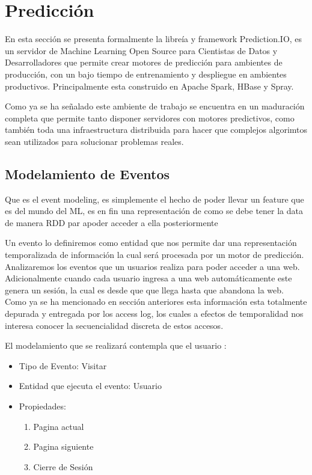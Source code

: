 

\section{Predicción }

  En esta sección se presenta formalmente la libreía y framework Prediction.IO, %
  es un servidor de Machine Learning Open Source para Cientistas de Datos y Desarrolladores que permite
  crear motores de predicción para ambientes de producción, con un bajo tiempo de entrenamiento y despliegue en ambientes productivos. Principalmente esta construido en Apache Spark, HBase y Spray.

  Como ya se ha señalado este ambiente de trabajo se encuentra en un maduración completa que permite tanto disponer
  servidores con motores predictivos, como también toda una infraestructura distribuida para hacer que complejos algorimtos
  sean utilizados para solucionar problemas reales.

  \subsection{Modelamiento de Eventos}

Que es el event modeling, es simplemente el hecho de poder llevar un feature  que es del mundo del ML, es en fin una representación de como se debe tener la data de manera RDD par apoder acceder a ella posteriormente 

  Un evento lo definiremos como entidad que nos permite dar una representación temporalizada de información la cual será procesada por un motor de predicción. Analizaremos los eventos que un usuarios realiza para poder acceder a una web. Adicionalmente cuando cada usuario ingresa a una web automáticamente este genera un sesión, la cual es desde que que llega hasta que abandona la web.
  Como ya se ha mencionado en sección anteriores esta información esta totalmente depurada y entregada por los access log, los cuales a efectos de temporalidad nos interesa conocer la secuencialidad discreta de estos accesos.






  El modelamiento que se realizará contempla que el usuario :


    \begin{itemize}
      \item Tipo de Evento: Visitar
      \item Entidad que ejecuta el evento: Usuario
      \item Propiedades:
          \begin{enumerate}
            \item Pagina actual
            \item Pagina siguiente
            \item Cierre de Sesión
          \end{enumerate}
    \end{itemize}




